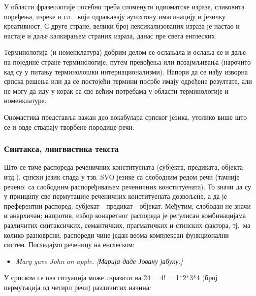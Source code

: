 \begin{multicols}{2}
У области фразеологије посебно треба споменути идиоматске изразе, сликовита поређења, изреке и сл. 
~који одражавају аутохтону имагинацију и језичку креативност. С друге стране, велики број лексикализованих израза је настао и настаје и даље калкирањем  страних израза, данас пре свега енглеских.

Терминологија (и номенклатура) добрим делом се ослањала и ослања се и даље на поједине стране терминологије, путем превођења или позајмљивања (нарочито кад су у питању терминолошки интернационализми).  Напори да се нађу изворна српска решења или да се постојећи термини посрбе имају одређене резултате, али не могу да иду у корак са све већим потребама у области терминологије и номенклатуре.  

Ономастика представља важан део вокабулара српског језика, утолико више што се и овде стварају творбене породице речи.


\subsubsection {Синтакса, лингвистика текста}
  
Што се тиче распореда реченичних конституената (субјекта, предиката, објекта итд.), српски језик спада у тзв. SVO језике са слободним редом речи (тачније речено: са слободним распоређивањем реченичних конституената). То значи да су у принципу све пермутације реченичних конституената дозвољене, а да је преферентни распоред: субјекат - предикат - објекат. Међутим, слободан не значи и анархичан; напротив, избор конкретног распореда је регулисан комбинацијама различитих синтаксичких, семантичких, прагматичких и стилских фактора, тј.~ма колико разноврсни, распореди чине један веома комплексан функционални систем. Погледајмо реченицу на енглеском: 
\begin{itemize}
\item \textit{Mary gave John an apple. [Марија даде Јовану јабуку.]} 
\end{itemize}
У српском се ова ситуација може изразити на 24 = 4! = 1*2*3*4 (број пермутација од четири речи) различитих начина:


\end{multicols}
